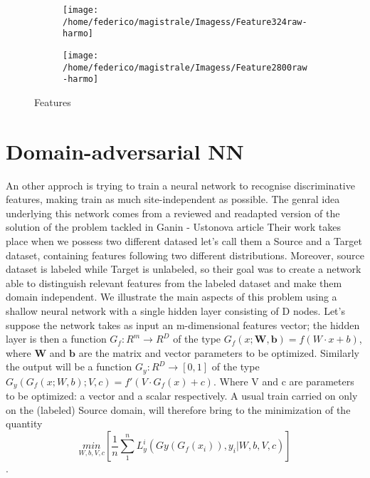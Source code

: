 \documentclass[a4paper,11pt]{article}
\begin{document}
\begin{figure}
\centering
\begin{subfigure}[b]{1.\textwidth}
   \texttt{[image: /home/federico/magistrale/Imagess/Feature324raw-harmo]}
   \caption{}
   \label{fig:feature324}
\end{subfigure}
\begin{subfigure}[b]{1.\textwidth}
   \texttt{[image: /home/federico/magistrale/Imagess/Feature2800raw-harmo]}
   \caption{}
   \label{fig:feature2800}
\end{subfigure}

\caption{Features}
\label{fig:features_raw-harmo}
\end{figure}


\section{Domain-adversarial NN}
An other approch is trying to train a neural network to recognise discriminative features, making train as much site-independent as possible.
The genral idea underlying this network comes from a reviewed and readapted version of the solution of the problem tackled in Ganin - Ustonova article
Their work takes place when we possess two different datased let's call them a Source and a Target dataset, containing features following two different distributions.
Moreover, source dataset is labeled while Target is unlabeled, so their goal was to create a network able to distinguish relevant features from the labeled dataset and make them domain independent.
We illustrate the main aspects of this problem using a shallow neural network with a single hidden layer consisting of D nodes.
Let's suppose the network takes as input an m-dimensional features vector;
the hidden layer is then a function $G_f : R^m \rightarrow R^D$ of the type $G_f(x; \textbf{W}, \textbf{b}) = f(W\cdot x + b)$, where $\textbf{W}$ and $\textbf{b}$ are the matrix and vector parameters to be optimized.
Similarly the output will be a function $G_y:R^D \rightarrow [0, 1]$ of the type $G_y(G_f(x; W, b); V, c) = f'(V\cdot G_f(x) + c)$.
Where V and c are parameters to be optimized: a vector and a scalar respectively.
A usual train carried on only on the (labeled) Source domain, will therefore bring to the minimization of the quantity
\begin{equation}
\underset{W, b, V, c}{min} \left[ \frac{1}{n}\sum_1^n L_y^i(Gy(G_f(x_i)), y_i | W, b, V, c)\right]
\end{equation}.
\end{document}
